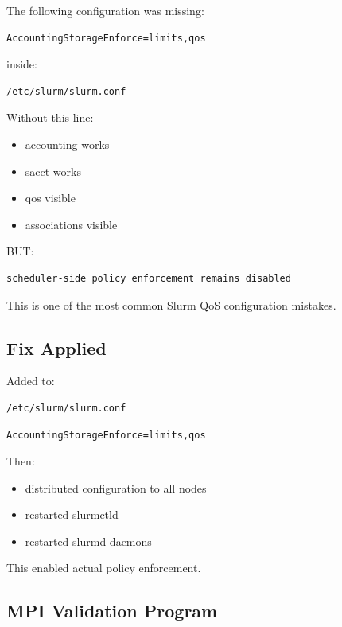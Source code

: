 \documentclass[11pt]{article}
\begin{document}
The following configuration was missing:

\begin{verbatim}
AccountingStorageEnforce=limits,qos
\end{verbatim}

inside:

\begin{verbatim}
/etc/slurm/slurm.conf
\end{verbatim}

Without this line:

\begin{itemize}
\item accounting works
\item sacct works
\item qos visible
\item associations visible
\end{itemize}

BUT:

\begin{verbatim}
scheduler-side policy enforcement remains disabled
\end{verbatim}

This is one of the most common Slurm QoS configuration mistakes.
\subsection{Fix Applied}
\label{sec:org319c170}

Added to:

\begin{verbatim}
/etc/slurm/slurm.conf
\end{verbatim}

\begin{verbatim}
AccountingStorageEnforce=limits,qos
\end{verbatim}

Then:

\begin{itemize}
\item distributed configuration to all nodes
\item restarted slurmctld
\item restarted slurmd daemons
\end{itemize}

This enabled actual policy enforcement.
\subsection{MPI Validation Program}
\label{sec:org4613400}
\end{document}
